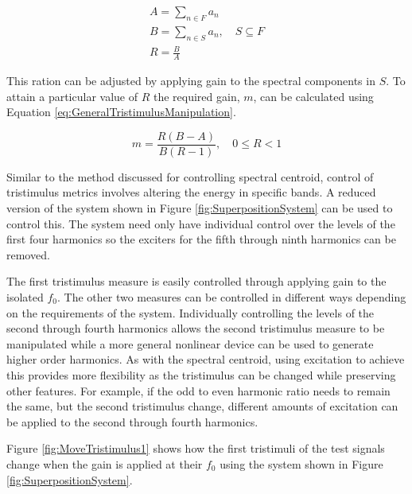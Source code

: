		\begin{gather}
			A = \sum_{n \in F} a_{n} \nonumber \\
			B = \sum_{n \in S} a_{n}, \quad S \subseteq F \nonumber \\
			R = \frac{B}{A}
			\label{eq:GeneralTristimulus}
		\end{gather}

		This ration can be adjusted by applying gain to the spectral components in $S$. To attain a particular
		value of $R$ the required gain, $m$, can be calculated using Equation
		\ref{eq:GeneralTristimulusManipulation}.

		\begin{equation}
			m = \frac{R(B - A)}{B(R - 1)}, \quad 0 \leq R < 1
			\label{eq:GeneralTristimulusManipulation}
		\end{equation}

		Similar to the method discussed for controlling spectral centroid, control of tristimulus metrics involves
		altering the energy in specific bands. A reduced version of the system shown in Figure
		\ref{fig:SuperpositionSystem} can be used to control this. The system need only have individual control
		over the levels of the first four harmonics so the exciters for the fifth through ninth harmonics can be
		removed.

		The first tristimulus measure is easily controlled through applying gain to the isolated $f_{0}$.  The
		other two measures can be controlled in different ways depending on the requirements of the system.
		Individually controlling the levels of the second through fourth harmonics allows the second tristimulus
		measure to be manipulated while a more general nonlinear device can be used to generate higher order
		harmonics. As with the spectral centroid, using excitation to achieve this provides more flexibility as the
		tristimulus can be changed while preserving other features. For example, if the odd to even harmonic ratio
		needs to remain the same, but the second tristimulus change, different amounts of excitation can be applied
		to the second through fourth harmonics.

		Figure \ref{fig:MoveTristimulus1} shows how the first tristimuli of the test signals change when the gain
		is applied at their $f_{0}$ using the system shown in Figure \ref{fig:SuperpositionSystem}.

